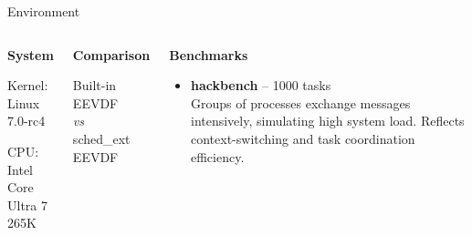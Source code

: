 \documentclass[aspectratio=169]{beamer}
\begin{document}
\begin{frame}{Environment}
        \begin{columns}[T]
                \begin{shadowbox}
                        \small\textbf{System}

                        \vspace{0.25cm}
                        \footnotesize
                        Kernel:\\Linux 7.0-rc4

                        \vspace{0.25cm}
                        CPU:\\Intel Core\\ Ultra 7 265K
                \end{shadowbox}

                \vspace{0.3cm}

                \begin{shadowbox}
                        \small\textbf{Comparison}

                        \vspace{0.2cm}
                        \footnotesize
                        Built-in EEVDF\\
                        \textit{vs}\\
                        sched\_ext EEVDF\\
                \end{shadowbox}

                \begin{shadowbox}
                        \small\textbf{Benchmarks}

                        \vspace{0.1cm}
                        \footnotesize
                \begin{itemize}\setlength{\itemsep}{0.05cm}\setlength{\parskip}{0pt}
                                \item \textbf{hackbench} -- 1000 tasks\\
                                        Groups of processes exchange messages
                                        intensively, simulating high
                                        system load.
                                        Reflects context-switching and task
                                        coordination efficiency.


\end{itemize}
\end{shadowbox}
\end{columns}
\end{frame}
\end{document}
